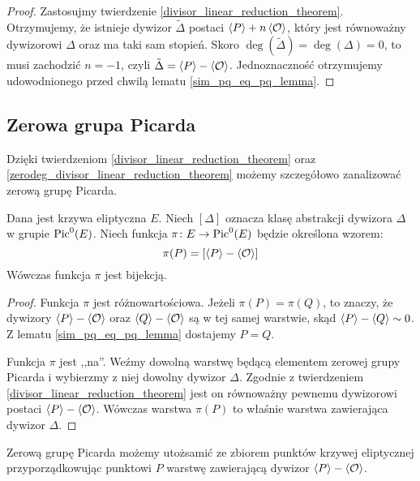 \begin{proof}
Zastosujmy twierdzenie \ref{divisor_linear_reduction_theorem}.
Otrzymujemy, że istnieje dywizor $\tilde{\Delta}$
postaci $\left\langle P\right\rangle + n\left\langle\mathcal{O}\right\rangle$,
który jest równoważny dywizorowi $\Delta$ oraz ma taki sam stopień.
Skoro $\deg(\tilde{\Delta}) = \deg(\Delta) = 0$,
to musi zachodzić $n = -1$, czyli $\tilde{\Delta} = \left\langle P\right\rangle - \left\langle\mathcal{O}\right\rangle$.
Jednoznaczność otrzymujemy udowodnionego przed chwilą lematu
\ref{sim_pq_eq_pq_lemma}.
\end{proof}

\subsection*{Zerowa grupa Picarda}

\noindent
Dzięki twierdzeniom \ref{divisor_linear_reduction_theorem}
oraz \ref{zerodeg_divisor_linear_reduction_theorem}
możemy szczegółowo zanalizować zerową grupę Picarda.

\begin{theorem}\label{piczero_curvepts_bijection_theorem}
Dana jest krzywa eliptyczna $E$.
Niech $[\Delta]$ oznacza klasę abstrakcji dywizora $\Delta$
w grupie $\operatorname{Pic}^0(E)$.
Niech funkcja $\pi\colon E \to \operatorname{Pic}^0(E)$ będzie określona wzorem:
\begin{equation}\label{piczero_bijection_eqn}
\pi(P) = [\left\langle P\right\rangle - \left\langle\mathcal{O}\right\rangle]
\end{equation}
Wówczas funkcja $\pi$ jest bijekcją.
\end{theorem}

\begin{proof}
Funkcja $\pi$ jest różnowartościowa. Jeżeli $\pi(P) = \pi(Q)$,
to znaczy, że dywizory $\left\langle P\right\rangle - \left\langle\mathcal{O}\right\rangle$
oraz $\left\langle Q\right\rangle - \left\langle\mathcal{O}\right\rangle$ są w tej samej warstwie,
skąd $\left\langle P\right\rangle - \left\langle Q\right\rangle \sim 0$.
Z lematu \ref{sim_pq_eq_pq_lemma} dostajemy $P = Q$.

\noindent
Funkcja $\pi$ jest ,,na''. Weźmy dowolną warstwę będącą elementem
zerowej grupy Picarda i wybierzmy z niej dowolny dywizor $\Delta$.
Zgodnie z twierdzeniem \ref{divisor_linear_reduction_theorem}
jest on równoważny pewnemu dywizorowi postaci $\left\langle P\right\rangle - \left\langle\mathcal{O}\right\rangle$.
Wówczas warstwa $\pi(P)$ to właśnie warstwa zawierająca dywizor $\Delta$.
\end{proof}

\begin{corollary}\label{piczero_representants_coro}
Zerową grupę Picarda możemy utożsamić
ze zbiorem punktów krzywej eliptycznej
przyporządkowując punktowi $P$
warstwę zawierającą dywizor $\left\langle P\right\rangle - \left\langle\mathcal{O}\right\rangle$.
\end{corollary}

